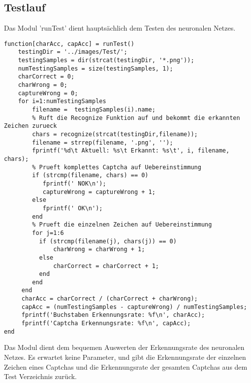 \subsection{Testlauf}
Das Modul 'runTest' dient hauptsächlich dem Testen des neuronalen Netzes. 
\begin{lstlisting}
function[charAcc, capAcc] = runTest()
    testingDir = '../images/Test/';    
    testingSamples = dir(strcat(testingDir, '*.png'));
    numTestingSamples = size(testingSamples, 1);
    charCorrect = 0;
    charWrong = 0;
    captureWrong = 0;
    for i=1:numTestingSamples
        filename =  testingSamples(i).name;
        % Ruft die Recognize Funktion auf und bekommt die erkannten Zeichen zurueck
        chars = recognize(strcat(testingDir,filename));
        filename = strrep(filename, '.png', '');
        fprintf('%d\t Aktuell: %s\t Erkannt: %s\t', i, filename, chars);
        % Prueft komplettes Captcha auf Uebereinstimmung
        if (strcmp(filename, chars) == 0)
           fprintf(' NOK\n');
           captureWrong = captureWrong + 1;
        else
           fprintf(' OK\n');
        end
        % Prueft die einzelnen Zeichen auf Uebereinstimmung
        for j=1:6
          if (strcmp(filename(j), chars(j)) == 0) 
              charWrong = charWrong + 1;
          else
              charCorrect = charCorrect + 1;
          end
        end   
     end
     charAcc = charCorrect / (charCorrect + charWrong);
     capAcc = (numTestingSamples - captureWrong) / numTestingSamples;
     fprintf('Buchstaben Erkennungsrate: %f\n', charAcc);
     fprintf('Captcha Erkennungsrate: %f\n', capAcc);
end
\end{lstlisting}
Das Modul dient dem bequemen Auswerten der Erkennungsrate des neuronalen Netzes. Es erwartet keine Parameter, und gibt die Erkennungsrate der einzelnen Zeichen eines Captchas und die Erkennungsrate der gesamten Captchas aus dem Test Verzeichnis zurück.\\